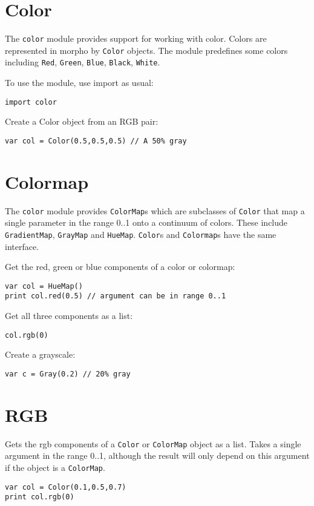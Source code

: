 \hypertarget{color}{%
\section{Color}\label{color}}

The \texttt{color} module provides support for working with color.
Colors are represented in morpho by \texttt{Color} objects. The module
predefines some colors including \texttt{Red}, \texttt{Green},
\texttt{Blue}, \texttt{Black}, \texttt{White}.

To use the module, use import as usual:

\begin{lstlisting}
import color
\end{lstlisting}

Create a Color object from an RGB pair:

\begin{lstlisting}
var col = Color(0.5,0.5,0.5) // A 50% gray
\end{lstlisting}

\hypertarget{colormap}{%
\section{Colormap}\label{colormap}}

The \texttt{color} module provides \texttt{ColorMap}s which are
subclasses of \texttt{Color} that map a single parameter in the range
0..1 onto a continuum of colors. These include \texttt{GradientMap},
\texttt{GrayMap} and \texttt{HueMap}. \texttt{Color}s and
\texttt{Colormap}s have the same interface.

Get the red, green or blue components of a color or colormap:

\begin{lstlisting}
var col = HueMap()
print col.red(0.5) // argument can be in range 0..1
\end{lstlisting}

Get all three components as a list:

\begin{lstlisting}
col.rgb(0)
\end{lstlisting}

Create a grayscale:

\begin{lstlisting}
var c = Gray(0.2) // 20% gray
\end{lstlisting}

\hypertarget{rgb}{%
\section{RGB}\label{rgb}}

Gets the rgb components of a \texttt{Color} or \texttt{ColorMap} object
as a list. Takes a single argument in the range 0..1, although the
result will only depend on this argument if the object is a
\texttt{ColorMap}.

\begin{lstlisting}
var col = Color(0.1,0.5,0.7)
print col.rgb(0)
\end{lstlisting}
